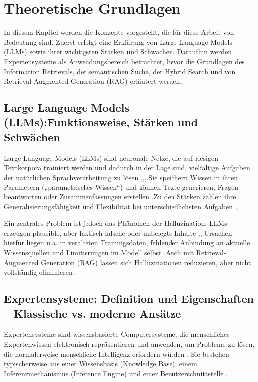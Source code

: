 \section{Theoretische Grundlagen}
\label{sec:theoretische-grundlagen}

In diesem Kapitel werden die Konzepte vorgestellt, die für diese Arbeit von Bedeutung sind. Zuerst erfolgt eine Erklärung von Large Language Models (LLMs) sowie ihrer wichtigsten Stärken und Schwächen. Daraufhin werden Expertensysteme als Anwendungsbereich betrachtet, bevor die Grundlagen des Information Retrievals, der semantischen Suche, der Hybrid Search und von Retrieval-Augmented Generation (RAG) erläutert werden..

\subsection{Large Language Models (LLMs):Funktionsweise, Stärken und Schwächen}

Large Language Models (LLMs) sind neuronale Netze, die auf riesigen Textkorpora trainiert werden und dadurch in der Lage sind, vielfältige Aufgaben der natürlichen Sprachverarbeitung zu lösen \cite{Huang2023},\cite{Sharma2025},\cite{Alansari2025},\cite{Xu2024Hallucination}.Sie speichern Wissen in ihren Parametern („parametrisches Wissen“) und können Texte generieren, Fragen beantworten oder Zusammenfassungen erstellen \cite{Brown2025A}.Zu den Stärken zählen ihre Generalisierungsfähigkeit und Flexibilität bei unterschiedlichsten Aufgaben \cite{Sharma2025},\cite{Brown2025A}.

Ein zentrales Problem ist jedoch das Phänomen der Halluzination: LLMs erzeugen plausible, aber faktisch falsche oder unbelegte Inhalte \cite{Huang2023},\cite{Alansari2025},\cite{Xu2024Hallucination}.Ursachen hierfür liegen u.a. in veralteten Trainingsdaten, fehlender Anbindung an aktuelle Wissensquellen und Limitierungen im Modell selbst \cite{Huang2023} \cite{Alansari2025} \cite{Xu2024Hallucination}.Auch mit Retrieval-Augmented Generation (RAG) lassen sich Halluzinationen reduzieren, aber nicht vollständig eliminieren \cite{Huang2023} \cite{Alansari2025}.


\subsection{Expertensysteme: Definition und Eigenschaften – Klassische vs. moderne Ansätze}

Expertensysteme sind wissensbasierte Computersysteme, die menschliches Expertenwissen elektronisch repräsentieren und anwenden, um Probleme zu lösen, die normalerweise menschliche Intelligenz erfordern würden \cite{HayesRoth1984} \cite{Salmanova2024} \cite{Nikolopoulos1997} \cite{Liao2004}. Sie bestehen typischerweise aus einer Wissensbasis (Knowledge Base), einem Inferenzmechanismus (Inference Engine) und einer Benutzerschnittstelle \cite{HayesRoth1984} \cite{Salmanova2024}.

